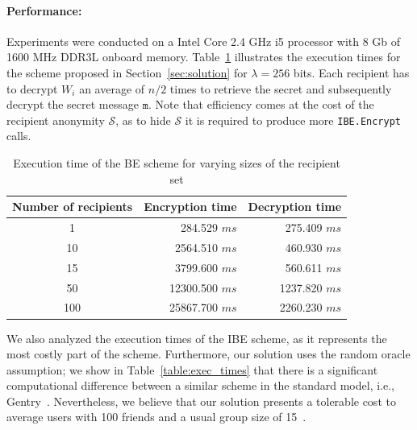 \documentclass{llncs}
\newcommand{\tabref}[1]{{Table}~\ref{#1}}
\newcommand{\secref}[1]{{Section}~\ref{#1}}
\newcommand{\msg}{\ensuremath{\mathtt{m}}}
\newcommand{\ms}{\ensuremath{ms}}
\begin{document}
\paragraph{Performance:} 
Experiments were conducted on a Intel Core 2.4 GHz i5 processor with 8 Gb of 1600 MHz DDR3L onboard memory. Table~\ref{table:BE_exec_times} illustrates the 
execution times for the scheme proposed in \secref{sec:solution} for $\lambda=256$ bits. Each recipient has to decrypt $W_i$ an average of $n/2$ times to retrieve the secret and subsequently decrypt the secret message \msg. Note that efficiency comes at the cost of the recipient anonymity $\mathcal{S}$, as to hide $\mathcal{S}$ it is required to produce more \texttt{IBE.Encrypt} calls.

\begin{table}
\begin{center}
\begin{tabular}{ | c | r | r |}
    \hline
    Number of recipients & Encryption time & Decryption time \\ \hline  \hline
    1 & 284.529 \ms & 275.409 \ms \\
    10 & 2564.510 \ms & 460.930 \ms \\
    15 & 3799.600 \ms & 560.611 \ms \\
    50 & 12300.500 \ms & 1237.820 \ms \\
    100 & 25867.700 \ms & 2260.230 \ms \\ \hline
\end{tabular}
\end{center}
\caption{Execution time of the BE scheme for varying sizes of the recipient set}
\label{table:BE_exec_times}
\end{table}

We also analyzed the execution times of the IBE scheme, as it represents the most costly part of the scheme. Furthermore, our solution uses the random oracle assumption; we show in \tabref{table:exec_times} that there is a significant computational difference between a similar scheme in the standard model, i.e., Gentry~\cite{GentryRandomOracles}.
Nevertheless, we believe that our solution presents a tolerable cost to average users with 100 friends and a usual group size of 15~\cite{DBLP:journals/corr/abs-1111-4503}. 
\end{document}
